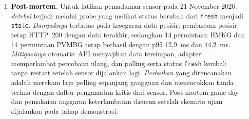 \begin{enumerate}
\item \textbf{Post-mortem.} Untuk latihan pemadaman sensor pada 21 November 2026, \emph{deteksi} terjadi melalui probe yang melihat status berubah dari \texttt{fresh} menjadi \texttt{stale}. \emph{Dampaknya} terbatas pada kesegaran data pesisir: pembacaan pesisir tetap HTTP~200 dengan data terakhir, sedangkan 14 permintaan BMKG dan 14 permintaan PVMBG tetap berhasil dengan p95 12{,}9~ms dan 44{,}2~ms. \emph{Mitigasinya} otomatis: API menyajikan data tersimpan, adapter memperlambat percobaan ulang, dan polling serta status \texttt{fresh} kembali tanpa restart setelah sensor dijalankan lagi. \emph{Perbaikan} yang direncanakan adalah merekam laju polling sepanjang gangguan dan mencocokkan tanda terima dengan daftar pengamatan kritis dari sensor. Post-mortem game day dan pemakaian anggaran keterlambatan disusun setelah skenario ujian dijalankan pada tahap demonstrasi.
\end{enumerate}
